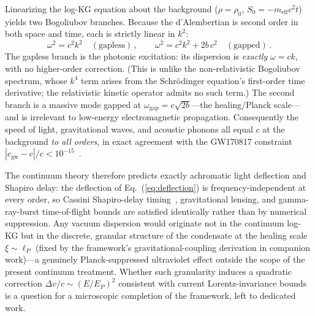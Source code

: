 \documentclass[12pt, a4paper]{article}
\begin{document}
Linearizing the log-KG equation about the background ($\rho = \rho_0$, $S_0 = -m_{\mathrm{eff}}c^2 t$) yields two Bogoliubov branches. Because the d'Alembertian is second order in both space and time, each is strictly linear in $k^2$:
\begin{equation}
    \omega^2 = c^2 k^2 \quad(\text{gapless})\,, \qquad \omega^2 = c^2 k^2 + 2 b\, c^2 \quad(\text{gapped})\,.
    \label{eq:photon_dispersion}
\end{equation}
The gapless branch is the photonic excitation: its dispersion is \emph{exactly} $\omega = ck$, with no higher-order correction. (This is unlike the non-relativistic Bogoliubov spectrum, whose $k^4$ term arises from the Schr\"{o}dinger equation's first-order time derivative; the relativistic kinetic operator admits no such term.) The second branch is a massive mode gapped at $\omega_{\mathrm{gap}} = c\sqrt{2b}$---the healing/Planck scale---and is irrelevant to low-energy electromagnetic propagation. Consequently the speed of light, gravitational waves, and acoustic phonons all equal $c$ at the background \emph{to all orders}, in exact agreement with the GW170817 constraint $|c_{\mathrm{gw}} - c|/c < 10^{-15}$~\cite{abbott_2017}.

The continuum theory therefore predicts exactly achromatic light deflection and Shapiro delay: the deflection of Eq.~(\ref{eq:deflection}) is frequency-independent at every order, so Cassini Shapiro-delay timing~\cite{bertotti_2003}, gravitational lensing, and gamma-ray-burst time-of-flight bounds are satisfied identically rather than by numerical suppression. Any vacuum dispersion would originate not in the continuum log-KG but in the discrete, granular structure of the condensate at the healing scale $\xi \sim \ell_P$ (fixed by the framework's gravitational-coupling derivation in companion work)---a genuinely Planck-suppressed ultraviolet effect outside the scope of the present continuum treatment. Whether such granularity induces a quadratic correction $\Delta v/c \sim (E/E_P)^2$ consistent with current Lorentz-invariance bounds is a question for a microscopic completion of the framework, left to dedicated work.
\end{document}
